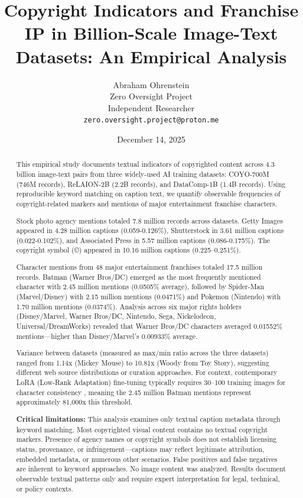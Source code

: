 \documentclass[11pt]{article}
\title{Copyright Indicators and Franchise IP in Billion-Scale Image-Text Datasets: An Empirical Analysis}
\author{
    Abraham Ohrenstein \\
    Zero Oversight Project \\
    Independent Researcher \\
    \texttt{zero.oversight.project@proton.me}
}
\date{December 14, 2025}
\begin{document}
\maketitle

\begin{abstract}

This empirical study documents textual indicators of copyrighted content across 4.3 billion image-text pairs from three widely-used AI training datasets: COYO-700M (746M records), ReLAION-2B (2.2B records), and DataComp-1B (1.4B records). Using reproducible keyword matching on caption text, we quantify observable frequencies of copyright-related markers and mentions of major entertainment franchise characters.

Stock photo agency mentions totaled 7.8 million records across datasets. Getty Images appeared in 4.28 million captions (0.059-0.126\%), Shutterstock in 3.61 million captions (0.022-0.102\%), and Associated Press in 5.57 million captions (0.086-0.175\%). The copyright symbol (©) appeared in 10.16 million captions (0.225--0.251\%).

Character mentions from 48 major entertainment franchises totaled 17.5 million records. Batman (Warner Bros/DC) emerged as the most frequently mentioned character with 2.45 million mentions (0.0505\% average), followed by Spider-Man (Marvel/Disney) with 2.15 million mentions (0.0471\%) and Pokemon (Nintendo) with 1.70 million mentions (0.0374\%). Analysis across six major rights holders (Disney/Marvel, Warner Bros/DC, Nintendo, Sega, Nickelodeon, Universal/DreamWorks) revealed that Warner Bros/DC characters averaged 0.01552\% mentions---higher than Disney/Marvel's 0.00933\% average.

Variance between datasets (measured as max/min ratio across the three datasets) ranged from 1.14x (Mickey Mouse) to 10.81x (Woody from Toy Story), suggesting different web source distributions or curation approaches. For context, contemporary LoRA (Low-Rank Adaptation) fine-tuning typically requires 30--100 training images for character consistency \citep{hu2021lora}, meaning the 2.45 million Batman mentions represent approximately 81,000x this threshold.

\textbf{Critical limitations:} This analysis examines only textual caption metadata through keyword matching. Most copyrighted visual content contains no textual copyright markers. Presence of agency names or copyright symbols does not establish licensing status, provenance, or infringement---captions may reflect legitimate attribution, embedded metadata, or numerous other scenarios. False positives and false negatives are inherent to keyword approaches. No image content was analyzed. Results document observable textual patterns only and require expert interpretation for legal, technical, or policy contexts.
\end{abstract}
\end{document}
